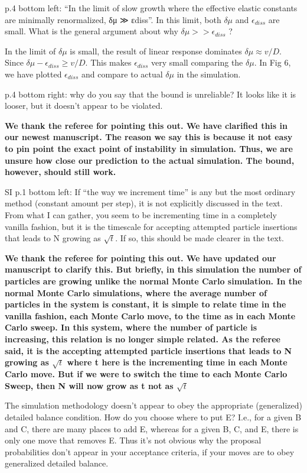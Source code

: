 \documentclass{letter}
\begin{document}
\begin{letter}{}
p.4 bottom left: “In the limit of slow growth where the effective 
elastic constants are minimally renormalized, δμ ≫ εdiss”. In this 
limit, both $\delta\mu$ and $\epsilon_{diss}$ are small. What is the 
general argument about why $\delta \mu >> \epsilon_{diss}$ ? 

{\bf

In the limit of $\delta\mu$ is small, the result of linear response dominates $\delta\mu \approx v/D$. Since $\delta\mu -\epsilon_{diss} \geq v/D$. This makes $\epsilon_{diss}$ very small comparing the $\delta\mu$. In Fig 6, we have plotted $\epsilon_{diss}$ and compare to actual $\delta\mu$ in the simulation. }


p.4 bottom right: why do you say that the bound is unreliable? It 
looks like it is looser, but it doesn’t appear to be violated. 

{\bf
We thank the referee for pointing this out. We have clarified this in our newest manuscript. The reason we say this is because it not easy to pin point the exact point of instability in simulation. Thus, we are unsure how close our prediction to the actual simulation. The bound, however, should still work.} 

SI p.1 bottom left: If “the way we increment time” is any but the most 
ordinary method (constant amount per step), it is not explicitly 
discussed in the text. From what I can gather, you seem to be 
incrementing time in a completely vanilla fashion, but it is the 
timescale for accepting attempted particle insertions that leads to N 
growing as $\sqrt{t}$. If so, this should be made clearer in the text. 

{\bf
We thank the referee for pointing this out. We have updated our manuscript to clarify this. But briefly, in this simulation the number of particles are growing unlike the normal Monte Carlo simulation. In the normal Monte Carlo simulations, where the average number of particles in the system is constant, it is simple to relate time in the vanilla fashion, each Monte Carlo move, to the time as in each Monte Carlo sweep. In this system, where the number of particle is increasing, this relation is no longer simple related. As the referee said, it is the accepting attempted particle insertions that leads to N growing as $\sqrt{t}$ where t here is the incrementing time in each Monte Carlo move. But if we were to switch the time to each Monte Carlo Sweep, then N will now grow as t not as $\sqrt{t}$}

The simulation methodology doesn’t appear to obey the appropriate 
(generalized) detailed balance condition. How do you choose where to 
put E? I.e., for a given B and C, there are many places to add E, 
whereas for a given B, C, and E, there is only one move that removes 
E. Thus it’s not obvious why the proposal probabilities don’t appear 
in your acceptance criteria, if your moves are to obey generalized 
detailed balance. 


\end{letter}
\end{document}
